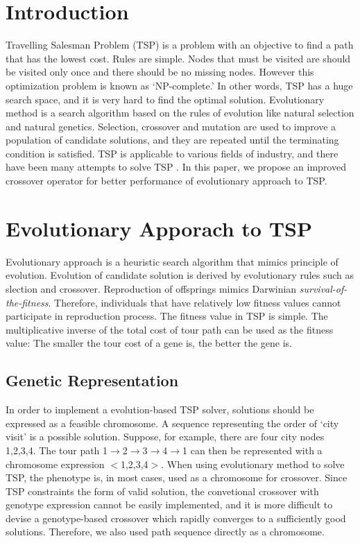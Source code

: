 
\section{Introduction}

Travelling Salesman Problem (TSP) is a problem with an objective to find a path that has the lowest cost. Rules are simple. Nodes that must be visited are should be visited only once and there should be no missing nodes. However this optimization problem is known as `NP-complete.' In other words, TSP has a huge search space, and it is very hard to find the optimal solution. Evolutionary method is a search algorithm based on the rules of evolution like natural selection and natural genetics\cite{golberg1989genetic}. Selection, crossover and mutation are used to improve a population of candidate solutions, and they are repeated until the terminating condition is satisfied. TSP is applicable to various fields of industry, and there have been many attempts to solve TSP \cite{fogel1993applying,banzhaf1990molecular,pereira2002gvr}. In this paper, we propose an improved crossover operator for better performance of evolutionary approach to TSP.

\section{Evolutionary Apporach to TSP}

Evolutionary approach is a heuristic search algorithm that mimics principle of evolution. Evolution of candidate solution is derived by evolutionary rules such as slection and crossover. Reproduction of offsprings mimics Darwinian {\it survival-of-the-fitness}. Therefore, individuals that have relatively low fitness values cannot participate in reproduction process. The fitness value in TSP is simple. The multiplicative inverse of the total cost of tour path can be used as the fitness value: The smaller the tour cost of a gene is, the better the gene is.

\subsection{Genetic Representation}

In order to implement a evolution-based TSP solver, solutions should be expressed as a feasible chromosome. A sequence representing the order of `city visit' is a possible solution. Suppose, for example, there are four city nodes {1,2,3,4}. The tour path 1$\rightarrow$2$\rightarrow$3$\rightarrow$4$\rightarrow$1 can then be represented with a chromosome expression $<$1,2,3,4$>$. When using evolutionary method to solve TSP, the phenotype is, in most cases, used as a chromosome for crossover. Since TSP constraints the form of valid solution, the convetional crossover with genotype expression cannot be easily implemented, and it is more difficult to devise a genotype-based crossover which rapidly converges to a sufficiently good solutions. Therefore, we also used path sequence directly as a chromosome.

